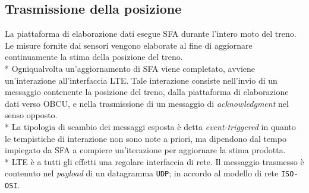 	\subsection{Trasmissione della posizione}
	La piattaforma di elaborazione dati esegue SFA durante l'intero moto del treno. Le misure fornite dai sensori vengono elaborate al fine di aggiornare continuamente la stima della posizione del treno.\\*
	Ogniqualvolta un'aggiornamento di SFA viene completato, avviene un'interazione all'interfaccia LTE. Tale interazione consiste nell'invio di un messaggio contenente la posizione del treno, dalla piattaforma di elaborazione dati verso OBCU, e nella trasmissione di un messaggio di \emph{acknowledgment} nel senso opposto.\\*
	La tipologia di scambio dei messaggi esposta \`e detta \emph{event-triggered} \cite{evttimetriggered} in quanto le tempistiche di interazione non sono note a priori, ma dipendono dal tempo impiegato da SFA a compiere un'iterazione per aggiornare la stima prodotta.\\*
	LTE \`e a tutti gli effetti una regolare interfaccia di rete. Il messaggio trasmesso \`e contenuto nel \emph{payload} di un datagramma \texttt{UDP}; in accordo al modello di rete \texttt{ISO-OSI}. \cite{libroreti}